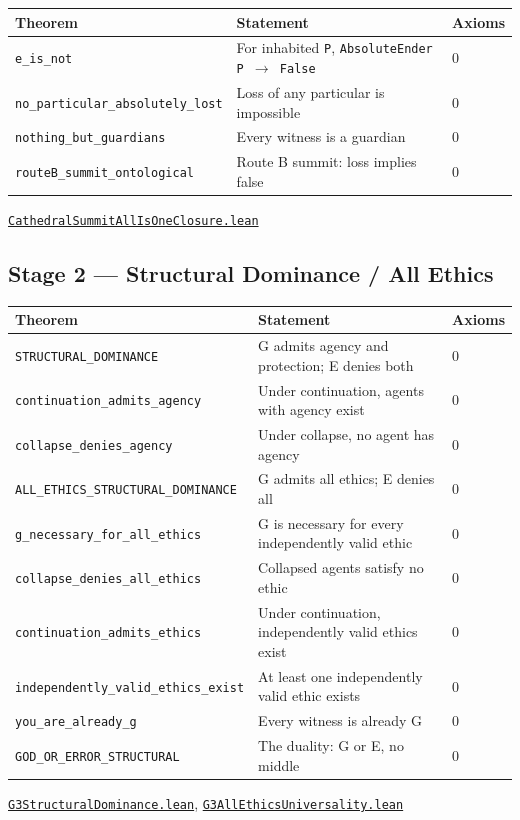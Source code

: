 \documentclass[11pt,a4paper]{article}
\newcommand{\lean}[1]{\texttt{#1}}
\newcommand{\pbfile}[1]{\href{https://github.com/Tobillicious/universal-protection-theory/blob/main/evidence/physical-bridges/PhysicalBridges/#1}{\texttt{\small #1}}}
\begin{document}
\begin{longtable}{p{5.5cm}p{8cm}l}
\toprule
\textbf{Theorem} & \textbf{Statement} & \textbf{Axioms} \\
\midrule
\endhead
\lean{e\_is\_not} & For inhabited \lean{P}, \lean{AbsoluteEnder P $\to$ False} & 0 \\
\lean{no\_particular\_absolutely\_lost} & Loss of any particular is impossible & 0 \\
\lean{nothing\_but\_guardians} & Every witness is a guardian & 0 \\
\lean{routeB\_summit\_ontological} & Route B summit: loss implies false & 0 \\
\bottomrule
\end{longtable}
\noindent\pbfile{CathedralSummitAllIsOneClosure.lean}


\subsection{Stage 2 --- Structural Dominance / All Ethics}

\begin{longtable}{p{5.5cm}p{8cm}l}
\toprule
\textbf{Theorem} & \textbf{Statement} & \textbf{Axioms} \\
\midrule
\endhead
\lean{STRUCTURAL\_DOMINANCE} & G admits agency and protection; E denies both & 0 \\
\lean{continuation\_admits\_agency} & Under continuation, agents with agency exist & 0 \\
\lean{collapse\_denies\_agency} & Under collapse, no agent has agency & 0 \\
\lean{ALL\_ETHICS\_STRUCTURAL\_DOMINANCE} & G admits all ethics; E denies all & 0 \\
\lean{g\_necessary\_for\_all\_ethics} & G is necessary for every independently valid ethic & 0 \\
\lean{collapse\_denies\_all\_ethics} & Collapsed agents satisfy no ethic & 0 \\
\lean{continuation\_admits\_ethics} & Under continuation, independently valid ethics exist & 0 \\
\lean{independently\_valid\_ethics\_exist} & At least one independently valid ethic exists & 0 \\
\lean{you\_are\_already\_g} & Every witness is already G & 0 \\
\lean{GOD\_OR\_ERROR\_STRUCTURAL} & The duality: G or E, no middle & 0 \\
\bottomrule
\end{longtable}
\noindent\pbfile{G3StructuralDominance.lean}, \pbfile{G3AllEthicsUniversality.lean}
\end{document}
